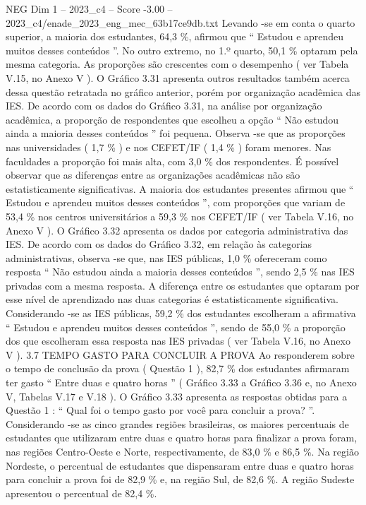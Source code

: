 \begin{textsample}{NEG Dim 1 – 2023\_c4 – Score -3.00 – 2023\_c4/enade\_2023\_eng\_mec\_63b17ce9db.txt}
Levando -se em conta o quarto superior, a maioria dos estudantes, 64,3 \%, afirmou que “ Estudou e aprendeu muitos desses conteúdos ”.
No outro extremo, no 1.º quarto, 50,1 \% optaram pela mesma categoria.
As proporções são crescentes com o desempenho ( ver Tabela V.15, no Anexo V ).
O Gráfico 3.31 apresenta outros resultados também acerca dessa questão retratada no gráfico anterior, porém por organização acadêmica das IES.
De acordo com os dados do Gráfico 3.31, na análise por organização acadêmica, a proporção de respondentes que escolheu a opção “ Não estudou ainda a maioria desses conteúdos ” foi pequena.
Observa -se que as proporções nas universidades ( 1,7 \% ) e nos CEFET/IF ( 1,4 \% ) foram menores.
Nas faculdades a proporção foi mais alta, com 3,0 \% dos respondentes.
É possível observar que as diferenças entre as organizações acadêmicas não são estatisticamente significativas.
A maioria dos estudantes presentes afirmou que “ Estudou e aprendeu muitos desses conteúdos ”, com proporções que variam de 53,4 \% nos centros universitários a 59,3 \% nos CEFET/IF ( ver Tabela V.16, no Anexo V ).
O Gráfico 3.32 apresenta os dados por categoria administrativa das IES.
De acordo com os dados do Gráfico 3.32, em relação às categorias administrativas, observa -se que, nas IES públicas, 1,0 \% ofereceram como resposta “ Não estudou ainda a maioria desses conteúdos ”, sendo 2,5 \% nas IES privadas com a mesma resposta.
A diferença entre os estudantes que optaram por esse nível de aprendizado nas duas categorias é estatisticamente significativa.
Considerando -se as IES públicas, 59,2 \% dos estudantes escolheram a afirmativa “ Estudou e aprendeu muitos desses conteúdos ”, sendo de 55,0 \% a proporção dos que escolheram essa resposta nas IES privadas ( ver Tabela V.16, no Anexo V ). 3.7 TEMPO GASTO PARA CONCLUIR A PROVA Ao responderem sobre o tempo de conclusão da prova ( Questão 1 ), 82,7 \% dos estudantes afirmaram ter gasto “ Entre duas e quatro horas ” ( Gráfico 3.33 a Gráfico 3.36 e, no Anexo V, Tabelas V.17 e V.18 ).
O Gráfico 3.33 apresenta as respostas obtidas para a Questão 1 : “ Qual foi o tempo gasto por você para concluir a prova? ”.
Considerando -se as cinco grandes regiões brasileiras, os maiores percentuais de estudantes que utilizaram entre duas e quatro horas para finalizar a prova foram, nas regiões Centro-Oeste e Norte, respectivamente, de 83,0 \% e 86,5 \%.
Na região Nordeste, o percentual de estudantes que dispensaram entre duas e quatro horas para concluir a prova foi de 82,9 \% e, na região Sul, de 82,6 \%.
A região Sudeste apresentou o percentual de 82,4 \%.

\end{textsample}

